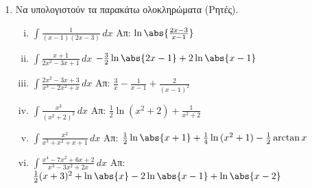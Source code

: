 \begin{enumerate}
	\item Να υπολογιστούν τα παρακάτω ολοκληρώματα (Ρητές).

		\begin{enumerate}[i)]
			\item $ \int \frac{1}{(x-1)(2x-3)} \,{dx} $ \hfill Απ: $
				\ln{\abs{\frac{2x-3}{x-1}}}$
			\item $ \int \frac{x+1}{2x^{2} - 3x + 1} \,{dx} $ \hfill $
				-\frac{3}{2} \ln{\abs{2x-1}} + 2 \ln{\abs{x-1}}$
			\item $ \int \frac{2x^{2} - 3x + 3}{x^{3} - 2x^{2} + x}  \,{dx}  $  \hfill Απ: $
				\frac{3}{x} - \frac{1}{x-1} + \frac{2}{(x-1)^{2}} $
			\item $ \int \frac{x^{3}}{(x^{2} + 2)^{2}} \,{dx} $ \hfill Απ: $
				\frac{1}{2} \ln{(x^{2} + 2)} + \frac{1}{x^{2} + 2} $ 
			\item $ \int \frac{x^{2}}{x^{3} + x^{2} + x +1} \,{dx} $ \hfill Απ:
				$ \frac{1}{2} \ln{\abs{x+1}} + \frac{1}{4} \ln{(x^{2} + 1)} -
				\frac{1}{2} \arctan x$
			\item $ \int \frac{x^{4}-7x^{2}+6x+2}{x^{3}-3x^{2}+2x} \,{dx} $
				\hfill Απ: $ \frac{1}{2} (x+3)^{2} + \ln{\abs{x}} -2 \ln{\abs{x-1}}
				+ \ln{\abs{x-2}}$
		\end{enumerate}



\end{enumerate}


